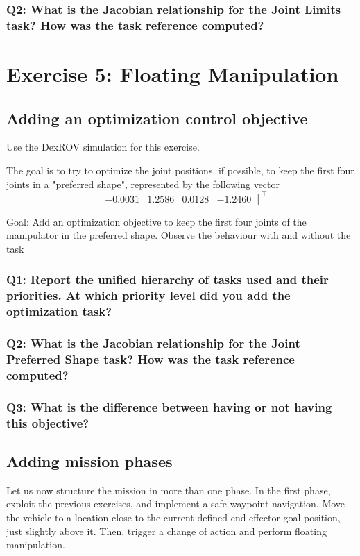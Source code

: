 \documentclass{article}
\begin{document}
\subsubsection{Q2: What is the Jacobian relationship for the Joint Limits task? How was the task reference computed?}

\clearpage
\section{Exercise 5: Floating Manipulation}
\subsection{Adding an optimization control objective}
Use the DexROV simulation for this exercise. 

The goal is to try to optimize the joint positions, if possible, to keep the first four joints in a "preferred shape", represented by the following vector
\begin{displaymath}
\begin{bmatrix}-0.0031 & 1.2586 & 0.0128 & -1.2460 \end{bmatrix}^\top
\end{displaymath}

Goal: Add an optimization objective to keep the first four joints of the manipulator in the preferred shape. Observe the behaviour with and without the task

\subsubsection{Q1: Report the unified hierarchy of tasks used and their priorities. At which priority level did you add the optimization task?}

\subsubsection{Q2: What is the Jacobian relationship for the Joint Preferred Shape task? How was the task reference computed?}

\subsubsection{Q3: What is the difference between having or not having this objective?}

\subsection{Adding mission phases}
Let us now structure the mission in more than one phase. In the first phase, exploit the previous exercises, and implement a safe waypoint navigation. Move the vehicle to a location close to the current defined end-effector goal position, just slightly above it. Then, trigger a change of action and perform floating manipulation.
\end{document}
